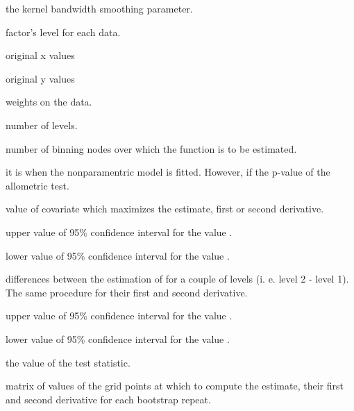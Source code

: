 \begin{Value}
\begin{ldescription}
\item[\code{h}] the kernel bandwidth smoothing parameter.

\item[\code{fmod}] factor's level for each data.

\item[\code{xdata}] original x values

\item[\code{ydata}] original y values

\item[\code{w}] weights on the data.

\item[\code{nf}] number of levels.

\item[\code{kbin}] number of binning nodes over which the function is to be estimated.

\item[\code{pvalue}] it is  when the nonparamentric model is fitted. However, if the p-value of the allometric test. 

\item[\code{max}] value of covariate  which maximizes the  estimate, first or second derivative.

\item[\code{maxu}] upper value of 95\% confidence interval for the value .

\item[\code{maxl}] lower value of 95\% confidence interval for the value .

\item[\code{diffmax}] differences between the estimation of  for a couple of levels (i. e. level 2 - level 1). The same procedure for their first and second derivative.

\item[\code{diffmaxu}] upper value of 95\% confidence interval for the value .

\item[\code{diffmaxl}] lower value of 95\% confidence interval for the value .

\item[\code{statistic}] the value of the test statistic.

\item[\code{repboot}] matrix of values of the grid points at which to compute the estimate, their first and second derivative for each bootstrap repeat.


\end{ldescription}
\end{Value}
